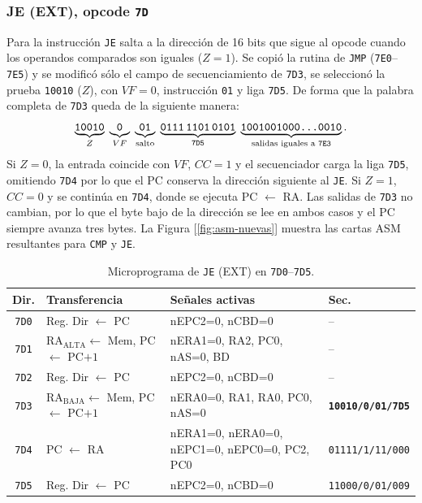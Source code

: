 \documentclass[letterpaper,12pt]{article}
\newcommand{\hx}[1]{\texttt{#1}}
\begin{document}
\subsubsection{JE (EXT), opcode \texttt{7D}}

Para la instrucción \texttt{JE} salta a la dirección de 16 bits que sigue al opcode cuando los operandos comparados son iguales ($Z=1$). Se copió la rutina de \texttt{JMP} (\hx{7E0}--\hx{7E5}) y se modificó sólo el campo de secuenciamiento de \hx{7D3}, se seleccionó la prueba \texttt{10010} ($Z$), con $VF=0$, instrucción \texttt{01} y liga \hx{7D5}. De forma que la palabra completa de \hx{7D3} queda de la siguiente manera:
\[
\underbrace{\texttt{10010}}_{Z}\;
\underbrace{\texttt{0}}_{VF}\;
\underbrace{\texttt{01}}_{\text{salto}}\;
\underbrace{\texttt{0111\,1101\,0101}}_{\hx{7D5}}\;
\underbrace{\texttt{1001001000\ldots0010}}_{\text{salidas iguales a \hx{7E3}}}.
\]
Si $Z=0$, la entrada coincide con $VF$, $CC=1$ y el secuenciador carga la liga \hx{7D5}, omitiendo \hx{7D4} por lo que el PC conserva la dirección siguiente al \texttt{JE}. Si $Z=1$, $CC=0$ y se continúa en \hx{7D4}, donde se ejecuta PC $\leftarrow$ RA. Las salidas de \hx{7D3} no cambian, por lo que el byte bajo de la dirección se lee en ambos casos y el PC siempre avanza tres bytes. La Figura [\ref{fig:asm-nuevas}] muestra las cartas ASM resultantes para \texttt{CMP} y \texttt{JE}.

\begin{table}[H]
\centering
\scriptsize
\caption{Microprograma de \texttt{JE} (EXT) en \hx{7D0}--\hx{7D5}.}
\label{tab:je}
\begin{tabularx}{\linewidth}{c l Y l}
\toprule
Dir. & Transferencia & Señales activas & Sec. \\
\midrule
\hx{7D0} & Reg. Dir $\leftarrow$ PC & nEPC2=0, nCBD=0 & -- \\
\hx{7D1} & RA$_{\text{ALTA}}\leftarrow$ Mem, PC $\leftarrow$ PC$+1$ & nERA1=0, RA2, PC0, nAS=0, BD & -- \\
\hx{7D2} & Reg. Dir $\leftarrow$ PC & nEPC2=0, nCBD=0 & -- \\
\hx{7D3} & RA$_{\text{BAJA}}\leftarrow$ Mem, PC $\leftarrow$ PC$+1$ & nERA0=0, RA1, RA0, PC0, nAS=0 & \textbf{\texttt{10010/0/01/7D5}} \\
\hx{7D4} & PC $\leftarrow$ RA & nERA1=0, nERA0=0, nEPC1=0, nEPC0=0, PC2, PC0 & \texttt{01111/1/11/000} \\
\hx{7D5} & Reg. Dir $\leftarrow$ PC & nEPC2=0, nCBD=0 & \texttt{11000/0/01/009} \\
\bottomrule
\end{tabularx}
\end{table}
\end{document}
